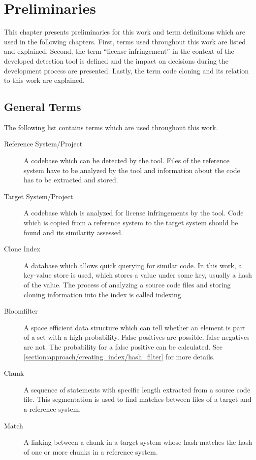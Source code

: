
\chapter{Preliminaries}\label{chapter:preliminaries}
This chapter presents preliminaries for this work and term definitions which are used in the following chapters.
First, terms used throughout this work are listed and explained.
Second, the term \enquote{license infringement} in the context of the developed detection tool is defined and the impact on decisions during the development process are presented.
Lastly, the term code cloning and its relation to this work are explained.

\section{General Terms}\label{section:preliminaries/terms}
The following list contains terms which are used throughout this work.

\begin{description}
	\item[Reference System/Project]
		A codebase which can be detected by the tool. 
		Files of the reference system have to be analyzed by the tool and information about the code has to be extracted and stored.
	\item[Target System/Project]
		A codebase which is analyzed for license infringements by the tool.
		Code which is copied from a reference system to the target system should be found and its similarity assessed.
	\item[Clone Index] 
		A database which allows quick querying for similar code.
		In this work, a key-value store is used, which stores a value under some key, usually a hash of the value.
		The process of analyzing a source code files and storing cloning information into the index is called indexing.
	\item [Bloomfilter]
		A space efficient data structure which can tell whether an element is part of a set with a high probability. 
		False positives are possible, false negatives are not.
		The probability for a false positive can be calculated. 
		See \autoref{section:approach/creating_index/hash_filter} for more details.
	\item [Chunk]
		A sequence of statements with specific length extracted from a source code file.
		This segmentation is used to find matches between files of a target and a reference system.
	\item [Match]
		A linking between a chunk in a target system whose hash matches the hash of one or more chunks in a reference system.
\end{description}


